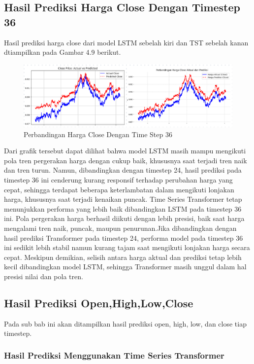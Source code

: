 \subsection{Hasil Prediksi Harga Close Dengan Timestep 36}
Hasil prediksi harga close dari model LSTM sebelah kiri dan TST sebelah kanan dtiampilkan pada Gambar 4.9 berikut.
\begin{figure} [H] \centering
    \includegraphics[scale=1.3]{gambar/perbandingan close(36).png} 
    \caption{Perbandingan Harga Close Dengan Time Step 36}
    \label{fig:label_gambar}
\end{figure}

Dari grafik tersebut dapat dilihat bahwa model LSTM masih mampu mengikuti pola tren pergerakan harga dengan cukup baik, khususnya saat terjadi tren naik dan tren turun. Namun, dibandingkan dengan timestep 24, hasil prediksi pada timestep 36 ini cenderung kurang responsif terhadap perubahan harga yang cepat, sehingga terdapat beberapa keterlambatan dalam mengikuti lonjakan harga, khususnya saat terjadi kenaikan puncak.
Time Series Transformer tetap menunjukkan performa yang lebih baik dibandingkan LSTM pada timestep 36 ini. Pola pergerakan harga berhasil diikuti dengan lebih presisi, baik saat harga mengalami tren naik, puncak, maupun penurunan.Jika dibandingkan dengan hasil prediksi Transformer pada timestep 24, performa model pada timestep 36 ini sedikit lebih stabil namun kurang tajam saat mengikuti lonjakan harga secara cepat. Meskipun demikian, selisih antara harga aktual dan prediksi tetap lebih kecil dibandingkan model LSTM, sehingga Transformer masih unggul dalam hal presisi nilai dan pola tren.
\subsection{Hasil Prediksi Open,High,Low,Close }
Pada sub bab ini akan ditampilkan hasil prediksi open, high, low, dan close tiap timestep.

\subsubsection{Hasil Prediksi Menggunakan Time Series Transformer}

